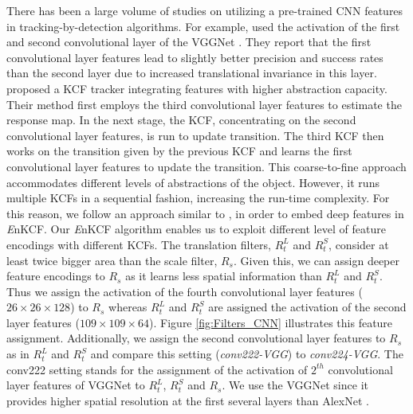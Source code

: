 \documentclass[10pt,twocolumn,letterpaper]{article}
\begin{document}
There has been a large volume of studies on utilizing a pre-trained
CNN features in tracking-by-detection algorithms. For example,
\cite{danelljan2015convolutional} used the activation of the first
and second convolutional layer of the VGGNet \cite{simonyan2014very}.
They report that the first convolutional layer features lead to
slightly better precision and success rates than the second layer due
to increased translational invariance in this
layer. \cite{ma2015hierarchical} proposed a KCF tracker integrating
features with higher abstraction capacity.  Their method first employs
the third convolutional layer features to estimate the response
map. In the next stage, the KCF, concentrating on the second
convolutional layer features, is run to update transition. The third
KCF then works on the transition given by the previous KCF and learns
the first convolutional layer features to update the transition. This
coarse-to-fine approach accommodates different levels of abstractions
of the object. However, it runs multiple KCFs in a sequential fashion,
increasing the run-time complexity. For this reason, we follow an
approach similar to \cite{danelljan2015convolutional}, in order to
embed deep features in {\it E}nKCF. Our {\it E}nKCF algorithm enables
us to exploit different level of feature encodings with different
KCFs. The translation filters, $R_{t}^{L}$ and $R_{t}^{S}$, consider
at least twice bigger area than the scale filter, $R_{s}$. Given this,
we can assign deeper feature encodings to $R_{s}$ as it learns less
spatial information than $R_{t}^{L}$ and $R_{t}^{S}$. Thus we assign
the activation of the fourth convolutional layer features
($26\times26\times128$) to $R_{s}$ whereas $R_{t}^{L}$ and $R_{t}^{S}$
are assigned the activation of the second layer features
($109\times109\times64$). Figure \ref{fig:Filters_CNN} illustrates
this feature assignment. Additionally, we assign the second
convolutional layer features to $R_{s}$ as in $R_{t}^{L}$ and
$R_{t}^{S}$ and compare this setting (\textit{conv222-VGG}) to
\textit{conv224-VGG}. The conv222 setting stands for the assignment of
the activation of $2^{th}$ convolutional layer features of VGGNet to
$R_{t}^{L}$, $R_{t}^{S}$ and $R_{s}$. We use the VGGNet since it
provides higher spatial resolution at the first several layers than
AlexNet \cite{krizhevsky2012imagenet}.
\end{document}
